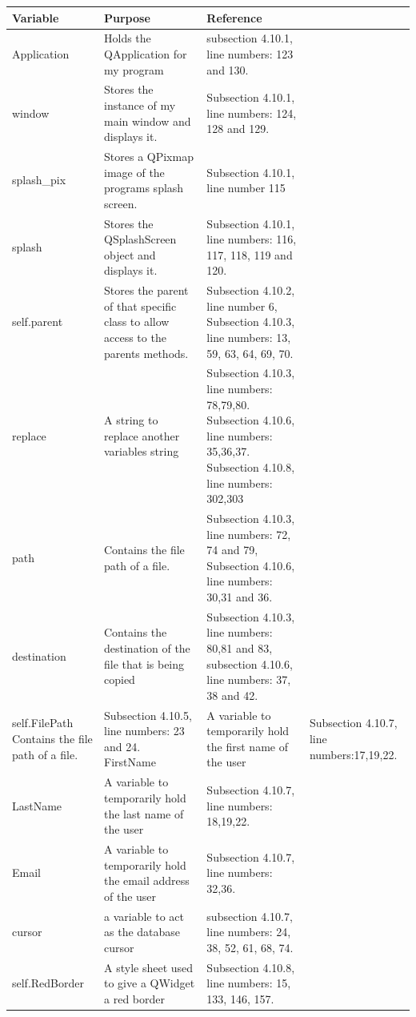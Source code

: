 \begin{center}
\begin{longtable}{|p{5cm}|p{6cm}|p{3.5cm}|} \hline
\textbf{Variable} & \textbf{Purpose} & \textbf{Reference} \\ \hline
Application & Holds the QApplication for my program & subsection 4.10.1, line numbers: 123 and 130. \\ \hline
window & Stores the instance of my main window and displays it. & Subsection 4.10.1, line numbers: 124, 128 and 129. \\ \hline
splash\_pix & Stores a QPixmap image of the programs splash screen. & Subsection 4.10.1, line number 115 \\ \hline
splash & Stores the QSplashScreen object and displays it. & Subsection 4.10.1, line numbers: 116, 117, 118, 119 and 120. \\ \hline
self.parent & Stores the parent of that specific class to allow access to the parents methods. & Subsection 4.10.2, line number 6, Subsection 4.10.3, line numbers: 13, 59, 63, 64, 69, 70. \\ \hline
replace & A string to replace another variables string & Subsection 4.10.3, line numbers: 78,79,80. Subsection 4.10.6, line numbers: 35,36,37. Subsection 4.10.8, line numbers: 302,303 \\ \hline
path & Contains the file path of a file. & Subsection 4.10.3, line numbers: 72, 74 and 79, Subsection 4.10.6, line numbers: 30,31 and 36. \\ \hline
destination & Contains the destination of the file that is being  copied & Subsection 4.10.3, line numbers: 80,81 and 83, subsection 4.10.6, line numbers: 37, 38 and 42. \\ \hline
self.FilePath  Contains the file path of a file. & Subsection 4.10.5, line numbers: 23 and 24.
FirstName & A variable to temporarily hold the first name of the user & Subsection 4.10.7, line numbers:17,19,22. \\ \hline
LastName & A variable to temporarily hold the last name of the user & Subsection 4.10.7, line numbers: 18,19,22. \\ \hline
Email & A variable to temporarily hold the email address of the user & Subsection 4.10.7, line numbers: 32,36. \\ \hline
cursor & a variable to act as the database cursor & subsection 4.10.7, line numbers: 24, 38, 52, 61, 68, 74. \\ \hline
self.RedBorder & A style sheet used to give a QWidget a red border & Subsection 4.10.8, line numbers: 15, 133, 146, 157. \\ \hline

\end{longtable}
\end{center}
